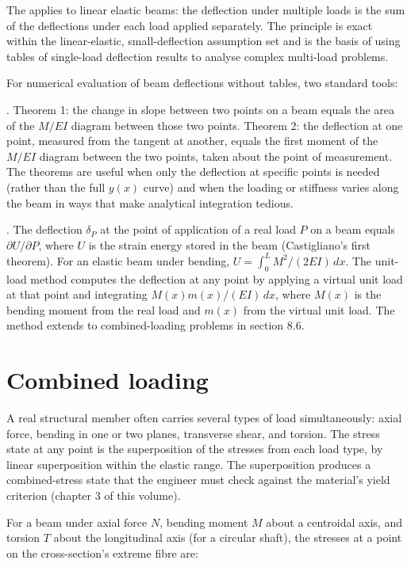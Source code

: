 The  applies to linear elastic
beams: the deflection under multiple loads is the sum of the
deflections under each load applied separately. The principle is
exact within the linear-elastic, small-deflection assumption set and
is the basis of using tables of single-load deflection results to
analyse complex multi-load problems.

For numerical evaluation of beam deflections without tables, two
standard tools:

. Theorem 1: the change in slope
between two points on a beam equals the area of the $M/EI$ diagram
between those two points. Theorem 2: the deflection at one point,
measured from the tangent at another, equals the first moment of the
$M/EI$ diagram between the two points, taken about the point of
measurement. The theorems are useful when only the deflection at
specific points is needed (rather than the full $y(x)$ curve) and
when the loading or stiffness varies along the beam in ways that
make analytical integration tedious.

. The deflection $\delta_P$ at
the point of application of a real load $P$ on a beam equals
$\partial U/\partial P$, where $U$ is the strain energy stored in
the beam (Castigliano's first theorem). For an elastic beam under
bending, $U = \int_0^L M^2/(2EI) \,dx$. The unit-load method
computes the deflection at any point by applying a virtual unit
load at that point and integrating $M(x) m(x)/(EI) \,dx$, where
$M(x)$ is the bending moment from the real load and $m(x)$ from the
virtual unit load. The method extends to combined-loading problems
in section 8.6.

\section{Combined loading}

A real structural member often carries several types of load
simultaneously: axial force, bending in one or two planes, transverse
shear, and torsion. The stress state at any point is the
superposition of the stresses from each load type, by linear
superposition within the elastic range. The superposition produces a
combined-stress state that the engineer must check against the
material's yield criterion (chapter 3 of this volume).

For a beam under axial force $N$, bending moment $M$ about a
centroidal axis, and torsion $T$ about the longitudinal axis (for a
circular shaft), the stresses at a point on the cross-section's
extreme fibre are:

